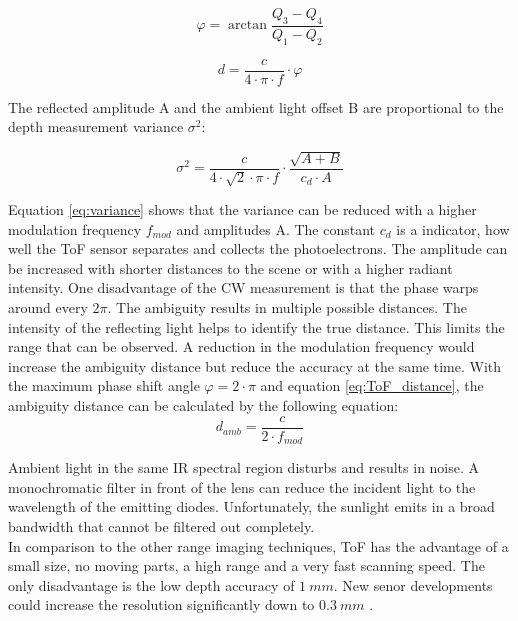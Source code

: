 \begin{equation}
\varphi = \arctan \frac{Q_3 - Q_4}{Q_1 - Q_2}
\end{equation}

\begin{equation}
d=\frac{c}{4\cdot \pi \cdot f}\cdot \varphi
\label{eq:ToF_distance}
\end{equation}
\medskip

The reflected amplitude A and the ambient light offset B are proportional to the depth measurement variance $\sigma^2$:

\begin{equation}
\sigma^2=\frac{c}{4 \cdot \sqrt{2} \cdot \pi \cdot f} \cdot \frac{\sqrt{A+B}}{c_d \cdot A}
\label{eq:variance}
\end{equation}\medskip

Equation \ref{eq:variance} shows that the variance can be reduced with a higher modulation frequency $f_{mod}$ and amplitudes A. The constant $c_d$ is a indicator, how well the ToF sensor separates and collects the photoelectrons. The amplitude can be increased with shorter distances to the scene or with a higher radiant intensity. One disadvantage of the CW measurement is that the phase warps around every $2\pi$. The ambiguity results in multiple possible distances. The intensity of the reflecting light helps to identify the true distance. This limits the range that can be observed. A reduction in the modulation frequency would increase the ambiguity distance but reduce the accuracy at the same time. With the maximum phase shift angle $\varphi = 2\cdot\pi$ and equation \ref{eq:ToF_distance}, the ambiguity distance can be calculated by the following equation:\\

\begin{equation}
d_{amb}=\frac{c}{2\cdot f_{mod}}
\end{equation}
\medskip

Ambient light in the same IR spectral region disturbs and results in noise. A monochromatic filter in front of the lens can reduce the incident light to the wavelength of the emitting diodes. Unfortunately, the sunlight emits in a broad bandwidth that cannot be filtered out completely.\\

 In comparison to the other range imaging techniques, ToF has the advantage of a small size, no moving parts, a high range and a very fast scanning speed. The only disadvantage is the low depth accuracy of $1~mm$. New senor developments could increase the resolution significantly down to $0.3~mm$ \cite{thierryoggietof}.

